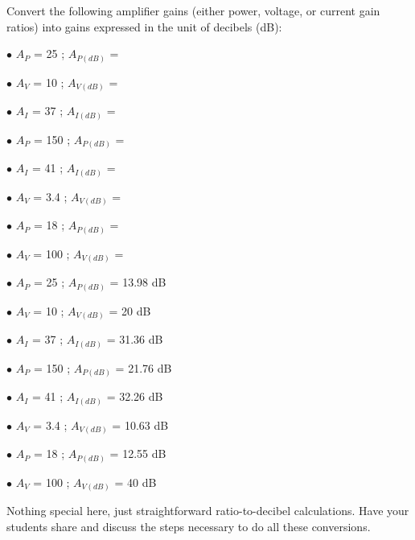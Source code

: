 

Convert the following amplifier gains (either power, voltage, or current gain ratios) into gains expressed in the unit of decibels (dB):

\medskip
\goodbreak
\item{$\bullet$} $A_P$ = 25 ; $A_{P(dB)}$ = 
\item{$\bullet$} $A_V$ = 10 ; $A_{V(dB)}$ = 
\item{$\bullet$} $A_I$ = 37 ; $A_{I(dB)}$ = 
\item{$\bullet$} $A_P$ = 150 ; $A_{P(dB)}$ = 
\item{$\bullet$} $A_I$ = 41 ; $A_{I(dB)}$ = 
\item{$\bullet$} $A_V$ = 3.4 ; $A_{V(dB)}$ = 
\item{$\bullet$} $A_P$ = 18 ; $A_{P(dB)}$ = 
\item{$\bullet$} $A_V$ = 100 ; $A_{V(dB)}$ = 
\medskip







\medskip
\goodbreak
\item{$\bullet$} $A_P$ = 25 ; $A_{P(dB)}$ = 13.98 dB
\item{$\bullet$} $A_V$ = 10 ; $A_{V(dB)}$ = 20 dB
\item{$\bullet$} $A_I$ = 37 ; $A_{I(dB)}$ = 31.36 dB
\item{$\bullet$} $A_P$ = 150 ; $A_{P(dB)}$ = 21.76 dB
\item{$\bullet$} $A_I$ = 41 ; $A_{I(dB)}$ = 32.26 dB
\item{$\bullet$} $A_V$ = 3.4 ; $A_{V(dB)}$ = 10.63 dB
\item{$\bullet$} $A_P$ = 18 ; $A_{P(dB)}$ = 12.55 dB
\item{$\bullet$} $A_V$ = 100 ; $A_{V(dB)}$ = 40 dB
\medskip







Nothing special here, just straightforward ratio-to-decibel calculations.  Have your students share and discuss the steps necessary to do all these conversions.




